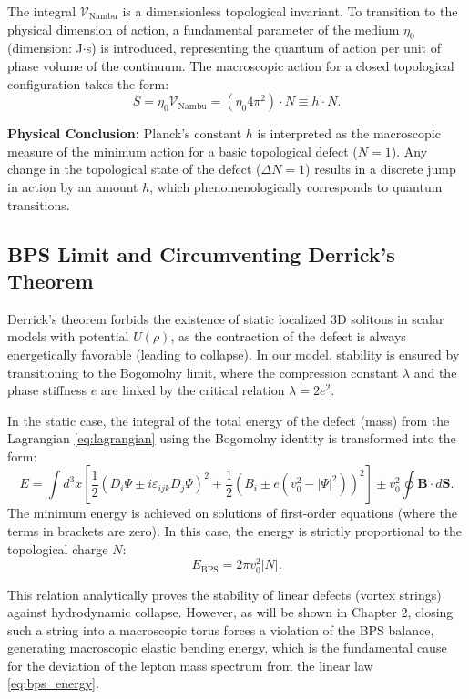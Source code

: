 \documentclass[11pt,a4paper]{article}
\begin{document}
	The integral $\mathcal{V}_{\text{Nambu}}$ is a dimensionless topological invariant. To transition to the physical dimension of action, a fundamental parameter of the medium $\eta_0$ (dimension: J$\cdot$s) is introduced, representing the quantum of action per unit of phase volume of the continuum. The macroscopic action for a closed topological configuration takes the form:
	\begin{equation}
		S = \eta_0 \mathcal{V}_{\text{Nambu}} = (\eta_0 4\pi^2) \cdot N \equiv h \cdot N.
	\end{equation}
	
	\textbf{Physical Conclusion:} Planck's constant $h$ is interpreted as the macroscopic measure of the minimum action for a basic topological defect ($N=1$). Any change in the topological state of the defect ($\Delta N = 1$) results in a discrete jump in action by an amount $h$, which phenomenologically corresponds to quantum transitions.
	
	\subsection{BPS Limit and Circumventing Derrick's Theorem}
	Derrick's theorem forbids the existence of static localized 3D solitons in scalar models with potential $U(\rho)$, as the contraction of the defect is always energetically favorable (leading to collapse). 
	In our model, stability is ensured by transitioning to the Bogomolny limit, where the compression constant $\lambda$ and the phase stiffness $e$ are linked by the critical relation $\lambda = 2e^2$.
	
	In the static case, the integral of the total energy of the defect (mass) from the Lagrangian \eqref{eq:lagrangian} using the Bogomolny identity is transformed into the form:
	\begin{equation}
		E = \int d^3x \left[ \frac{1}{2} \left( D_i \Psi \pm i \varepsilon_{ijk} D_j \Psi \right)^2 + \frac{1}{2} \left( B_i \pm e(v_0^2 - |\Psi|^2) \right)^2 \right] \pm v_0^2 \oint \mathbf{B} \cdot d\mathbf{S}.
	\end{equation}
	The minimum energy is achieved on solutions of first-order equations (where the terms in brackets are zero). In this case, the energy is strictly proportional to the topological charge $N$:
	\begin{equation}
		E_{\text{BPS}} = 2\pi v_0^2 |N|.
		\label{eq:bps_energy}
	\end{equation}
	
	This relation analytically proves the stability of linear defects (vortex strings) against hydrodynamic collapse. However, as will be shown in Chapter 2, closing such a string into a macroscopic torus forces a violation of the BPS balance, generating macroscopic elastic bending energy, which is the fundamental cause for the deviation of the lepton mass spectrum from the linear law \eqref{eq:bps_energy}.
\end{document}
